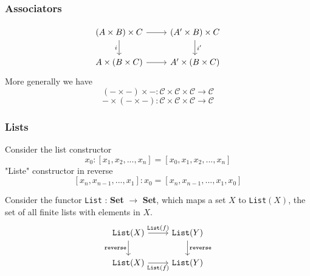 \documentclass[11pt]{article} %
\theoremstyle{definition}
\theoremstyle{definition}
\theoremstyle{definition}
\begin{document}
\subsubsection[]{Associators}
\[\begin{tikzcd}
	{(A\times B)\times C} & {(A'\times B)\times C} \\
	{A\times (B\times C)} & {A'\times (B\times C)}
	\arrow[from=1-1, to=1-2]
	\arrow["i"', from=1-1, to=2-1]
	\arrow["{i'}", from=1-2, to=2-2]
	\arrow[from=2-1, to=2-2]
\end{tikzcd}\]
More generally we have
\[(-\times -)\times - : \mathcal{C} \times \mathcal{C} \times \mathcal{C} \rightarrow \mathcal{C}\]
\[-\times (-\times -) : \mathcal{C} \times \mathcal{C} \times \mathcal{C} \rightarrow \mathcal{C}\]

\subsubsection{Lists}
Consider the list constructor
\[x_0 : [x_1,x_2,...,x_n] = [x_0,x_1,x_2,...,x_n]\]
"Liste" constructor in reverse
\[[x_n,x_{n-1},...,x_1]:x_0 = [x_n,x_{n-1},...,x_1,x_0]\]

Consider the functor \texttt{List} : \textbf{Set} $\rightarrow$ \textbf{Set},
which maps a set $X$ to \texttt{List}$(X)$, the set of all finite lists with elements in $X$.
\[\begin{tikzcd}
	{\texttt{List}(X)} & {\texttt{List}(Y)} \\
	{\texttt{List}(X)} & {\texttt{List}(Y)}
	\arrow["{\texttt{reverse}}", from=1-2, to=2-2]
	\arrow["{\texttt{List}(f)}", from=1-1, to=1-2]
	\arrow["{\texttt{reverse}}"', from=1-1, to=2-1]
	\arrow["{\texttt{List}(f)}"', from=2-1, to=2-2]
\end{tikzcd}\]
\end{document}
